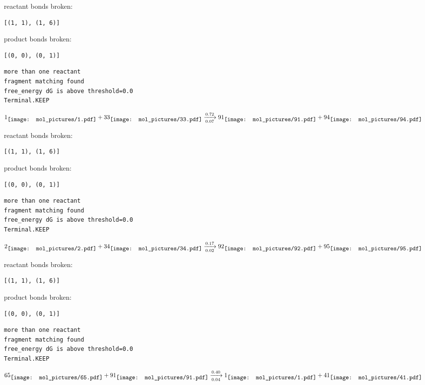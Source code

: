\documentclass{article}
\begin{document}
reactant bonds broken:\begin{verbatim}
[(1, 1), (1, 6)]
\end{verbatim}
product bonds broken:\begin{verbatim}
[(0, 0), (0, 1)]
\end{verbatim}




\vspace{1cm}
\begin{verbatim}
more than one reactant
fragment matching found
free_energy dG is above threshold=0.0
Terminal.KEEP
\end{verbatim}
$$
1
\raisebox{-.5\height}{\texttt{[image: mol\_pictures/1.pdf]}}
+
33
\raisebox{-.5\height}{\texttt{[image: mol\_pictures/33.pdf]}}
\xrightarrow[0.07]{0.72}
91
\raisebox{-.5\height}{\texttt{[image: mol\_pictures/91.pdf]}}
+
94
\raisebox{-.5\height}{\texttt{[image: mol\_pictures/94.pdf]}}
$$


reactant bonds broken:\begin{verbatim}
[(1, 1), (1, 6)]
\end{verbatim}
product bonds broken:\begin{verbatim}
[(0, 0), (0, 1)]
\end{verbatim}




\vspace{1cm}
\begin{verbatim}
more than one reactant
fragment matching found
free_energy dG is above threshold=0.0
Terminal.KEEP
\end{verbatim}
$$
2
\raisebox{-.5\height}{\texttt{[image: mol\_pictures/2.pdf]}}
+
34
\raisebox{-.5\height}{\texttt{[image: mol\_pictures/34.pdf]}}
\xrightarrow[0.02]{0.17}
92
\raisebox{-.5\height}{\texttt{[image: mol\_pictures/92.pdf]}}
+
95
\raisebox{-.5\height}{\texttt{[image: mol\_pictures/95.pdf]}}
$$


reactant bonds broken:\begin{verbatim}
[(1, 1), (1, 6)]
\end{verbatim}
product bonds broken:\begin{verbatim}
[(0, 0), (0, 1)]
\end{verbatim}




\vspace{1cm}
\begin{verbatim}
more than one reactant
fragment matching found
free_energy dG is above threshold=0.0
Terminal.KEEP
\end{verbatim}
$$
65
\raisebox{-.5\height}{\texttt{[image: mol\_pictures/65.pdf]}}
+
91
\raisebox{-.5\height}{\texttt{[image: mol\_pictures/91.pdf]}}
\xrightarrow[0.04]{0.40}
1
\raisebox{-.5\height}{\texttt{[image: mol\_pictures/1.pdf]}}
+
41
\raisebox{-.5\height}{\texttt{[image: mol\_pictures/41.pdf]}}
$$
\end{document}
